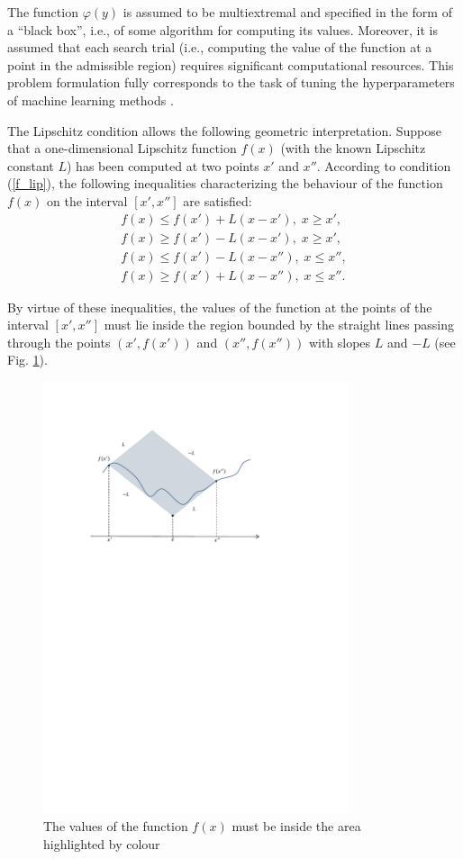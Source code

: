 \documentclass[preprint,12pt]{elsarticle}
\begin{document}
The function $\varphi(y)$ is assumed to be multiextremal and specified in the form of a ``black box'', i.e., of some algorithm for computing its values. Moreover, it is assumed that each search trial (i.e., computing the value of the function at a point in the admissible region) requires significant computational resources. This problem formulation fully corresponds to the task of tuning the hyperparameters of machine learning methods \cite{Joy2020,Wang2021}.


The Lipschitz condition allows the following geometric interpretation. Suppose that a one-dimensional Lipschitz function $f(x)$ (with the known Lipschitz constant $L$) has been computed at two points $x'$ and $x''$. According to condition (\ref{f_lip}), the following inequalities characterizing the behaviour of the function $f(x)$ on the interval $[x', x'']$  are satisfied:
\begin{gather*}
	f(x) \leq f(x') + L(x-x'), \; x \geq x',\\
	f(x) \geq f(x') - L(x-x'), \; x \geq x',\\
	f(x) \leq f(x') - L(x-x''), \; x \leq x'',\\
	f(x) \geq f(x') + L(x-x''), \; x \leq x''.
\end{gather*}

  By virtue of these inequalities, the values of the function at the points of the interval $[x', x'']$ must lie inside the region bounded by the straight lines passing through the points $(x', f(x'))$ and $(x'', f(x''))$ with slopes $L$ and $-L$ (see Fig. \ref{fig1}).

\begin{figure}
\centering
\includegraphics[width=0.8\textwidth]{Fig1.pdf}
\caption{The values of the function $f(x)$ must be inside the area highlighted by colour} \label{fig1}
\end{figure}
\end{document}
